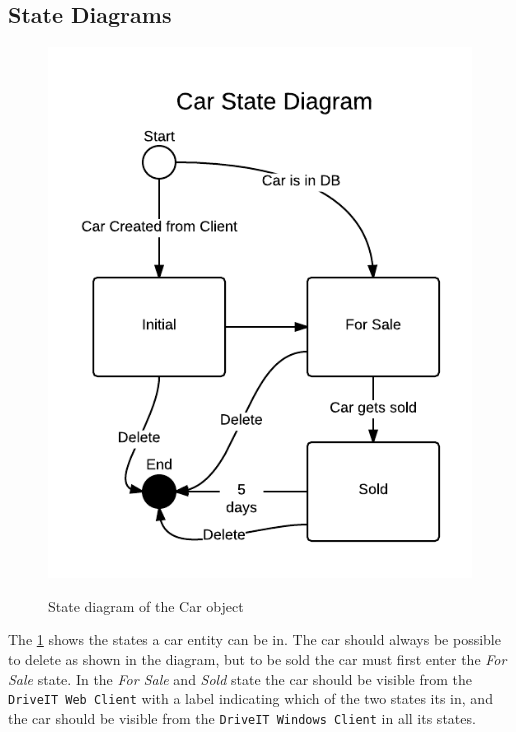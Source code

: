 \subsection{State Diagrams}
\begin{figure}[H]
	\centering
		\includegraphics[width=\textwidth]{Figures/StateDiagram-Car}\\
	\caption{State diagram of the Car object}
  \label{fig:StateDiagram-Car}
\end{figure}
The \ref{fig:StateDiagram-Car} shows the states a car entity can be in. The car should always be possible to delete as shown in the diagram, but to be sold the car must first enter the \emph{For Sale} state. In the \emph{For Sale} and \emph{Sold} state the car should be visible from the \texttt{DriveIT Web Client} with a label indicating which of the two states its in, and the car should be visible from the \texttt{DriveIT Windows Client} in all its states.\\
